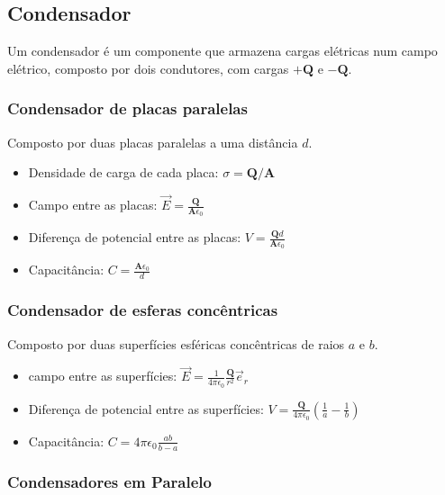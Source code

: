 \documentclass[11pt]{article}
\begin{document}
\break

\subsection{Condensador}

Um condensador é um componente que armazena cargas elétricas num campo elétrico, composto por dois condutores, com cargas $+\mathbf{Q}$ e $-\mathbf{Q}$.

\subsubsection{Condensador de placas paralelas}

Composto por duas placas paralelas a uma distância $d$.

\begin{itemize}
    \item Densidade de carga de cada placa: $\sigma = \mathbf{Q} / \mathbf{A}$
    \item Campo entre as placas: $\displaystyle \overrightarrow{E} = \frac{\mathbf{Q}}{\mathbf{A}\epsilon_0}$
    \item Diferença de potencial entre as placas: $\displaystyle V = \frac{\mathbf{Q}d}{\mathbf{A}\epsilon_0}$
    \item Capacitância: $\displaystyle C = \frac{\mathbf{A}\epsilon_0}{d}$
\end{itemize}

\subsubsection{Condensador de esferas concêntricas}

Composto por duas superfícies esféricas concêntricas de raios $a$ e $b$.

\begin{itemize}
    \item campo entre as superfícies: $\displaystyle \overrightarrow{E} = \frac{1}{4\pi\epsilon_0}\frac{\mathbf{Q}}{r^2}\overrightarrow{e}_r$
    \item Diferença de potencial entre as superfícies: $\displaystyle V = \frac{\mathbf{Q}}{4\pi\epsilon_0}\left(\frac{1}{a}-\frac{1}{b}\right)$
    \item Capacitância: $\displaystyle C = 4\pi\epsilon_0\frac{ab}{b-a}$
\end{itemize}

\subsubsection{Condensadores em Paralelo}
\end{document}
